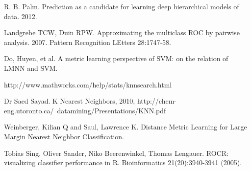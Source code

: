 \documentclass[12pt]{article}
\begin{document}
\begin{thebibliography}{}
R. B. Palm. Prediction as a candidate for learning deep hierarchical models of data. 2012.

Landgrebe TCW, Duin RPW. Approximating the multiclass ROC by pairwise analysis. 2007. Pattern Recognition LEtters 28:1747-58.

    Do, Huyen, et al. A metric learning perspective of SVM: on the relation of LMNN and SVM.

    http://www.mathworks.com/help/stats/knnsearch.html
    
    Dr Saed Sayad. K Nearest Neighbors, 2010, http://chem-eng.utoronto.ca/~datamining/Presentations/KNN.pdf
    
    Weinberger, Kilian Q and Saul, Lawrence K. Distance Metric Learning for Large Margin
Nearest Neighbor Classification.


Tobias Sing, Oliver Sander, Niko Beerenwinkel, Thomas Lengauer. ROCR: visualizing classifier performance in R. Bioinformatics 21(20):3940-3941 (2005).  

\end{thebibliography}
\end{document}

